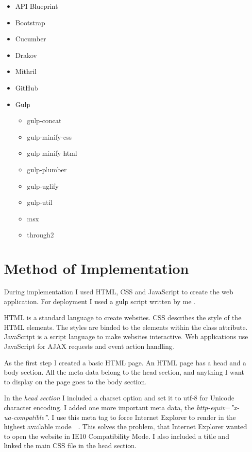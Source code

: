 \begin{itemize}
	\item API Blueprint
	\item Bootstrap
	\item Cucumber	
	\item Drakov
	\item Mithril
	\item GitHub
	\item Gulp
	\begin{itemize}
		\item gulp-concat
		\item gulp-minify-css
		\item gulp-minify-html
		\item gulp-plumber		
		\item gulp-uglify
		\item gulp-util
		\item msx
		\item through2
	\end{itemize}
\end{itemize}


\section{Method of Implementation}
During implementation I used HTML, CSS and JavaScript to create the web application. For deployment I used a gulp script written by me . 

HTML is a standard language to create websites. CSS describes the style of the HTML elements. The styles are binded to the elements within the class attribute. JavaScript is a script language to make websites interactive. Web applications use JavaScript for AJAX requests and event action handling. 

As the first step I created a basic HTML page. An HTML page has a head and a body section. All the meta data belong to the head section, and anything I want to display on the page goes to the body section. \label{html-impl}

In the \emph{head section} I included a charset option and set it to utf-8 for Unicode character encoding. I added one more important meta data, the \emph{http-equiv=''x-ua-compatible''}. I use this meta tag to force Internet Explorer to render in the highest available mode~\cite{IE10-microsoft}~\cite{IE10-html5-boiler}. This solves the problem, that Internet Explorer wanted to open the website in IE10 Compatibility Mode. I also included a title and linked the main CSS file in the head section.

